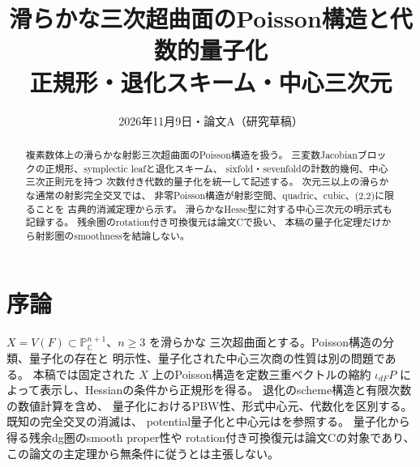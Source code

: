 
\title{滑らかな三次超曲面のPoisson構造と代数的量子化\\
\large 正規形・退化スキーム・中心三次元}
\author{}
\date{2026年11月9日・論文A（研究草稿）}

\maketitle
\begin{abstract}
複素数体上の滑らかな射影三次超曲面のPoisson構造を扱う。
三変数Jacobianブロックの正規形、symplectic leafと退化スキーム、
sixfold・sevenfoldの計数的幾何、中心三次正則元を持つ
次数付き代数的量子化を統一して記述する。
次元三以上の滑らかな通常の射影完全交叉では、
非零Poisson構造が射影空間、quadric、cubic、(2,2)に限ることを
古典的消滅定理から示す。
滑らかなHesse型に対する中心三次元の明示式も記録する。
残余圏のrotation付き可換復元は論文Cで扱い、
本稿の量子化定理だけから射影圏のsmoothnessを結論しない。
\end{abstract}
\tableofcontents
\section{序論}\label{sec:paperA-introduction}
\(X=V(F)\subset\mathbb P^{n+1}_{\mathbb C}\)、\(n\ge3\) を滑らかな
三次超曲面とする。Poisson構造の分類、量子化の存在と
明示性、量子化された中心三次商の性質は別の問題である。
本稿では固定された \(X\) 上のPoisson構造を定数三重ベクトルの縮約
\(\iota_{dF}P\) によって表示し、Hessianの条件から正規形を得る。
退化のscheme構造と有限次数の数値計算を含め、
量子化におけるPBW性、形式中心元、代数化を区別する。
既知の完全交叉の消滅は\cite{FuHwangCI}、
potential量子化と中心元は\cite{EG,SmithTate}を参照する。
量子化から得る残余dg圏のsmooth proper性や
rotation付き可換復元は論文Cの対象であり、
この論文の主定理から無条件に従うとは主張しない。







